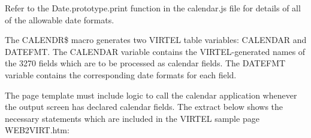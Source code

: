 \documentclass[letterpaper,10pt,english]{sphinxmanual}
\begin{document}
Refer to the Date.prototype.print function in the calendar.js file for details of all of the allowable date formats.

The CALENDR\$ macro generates two VIRTEL table variables: CALENDAR and DATEFMT. The CALENDAR variable
contains the VIRTEL-generated names of the 3270 fields which are to be processed as calendar fields. The DATEFMT
variable contains the corresponding date formats for each field.

The page template must include logic to call the calendar application whenever the output screen has declared
calendar fields. The extract below shows the necessary statements which are included in the VIRTEL sample page
WEB2VIRT.htm:

\begin{sphinxVerbatim}[commandchars=\\\{\}]
   

   
       
              
      
      
      
       
   


\end{sphinxVerbatim}
\end{document}
